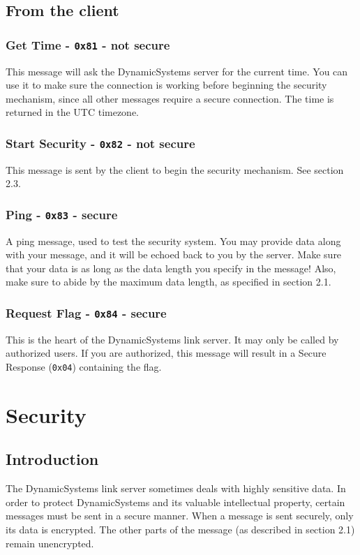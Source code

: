 \documentclass{report}
\newcommand{\companyName}{DynamicSystems\texttrademark}
\newcommand{\code}[1]{\texttt{#1}}
\begin{document}
\subsection{From the client}
\subsubsection{Get Time - \code{0x81} - not secure}
This message will ask the \companyName{} server for the current time.
You can use it to make sure the connection is working before beginning the security mechanism, since all other messages require a secure connection.
The time is returned in the UTC timezone.

\subsubsection{Start Security - \code{0x82} - not secure}
This message is sent by the client to begin the security mechanism. See section 2.3.

\subsubsection{Ping - \code{0x83} - secure}
A ping message, used to test the security system.
You may provide data along with your message, and it will be echoed back to you by the server.
Make sure that your data is as long as the data length you specify in the message!
Also, make sure to abide by the maximum data length, as specified in section 2.1.

\subsubsection{Request Flag - \code{0x84} - secure}
This is the heart of the \companyName{} link server.
It may only be called by authorized users.
If you are authorized, this message will result in a Secure Response (\code{0x04}) containing the flag.

\section{Security}
\subsection{Introduction}
The \companyName{} link server sometimes deals with highly sensitive data.
In order to protect \companyName{} and its valuable intellectual property, certain messages must be sent in a secure manner.
When a message is sent securely, only its data is encrypted. The other parts of the message (as described in section 2.1) remain unencrypted. \\
\end{document}
